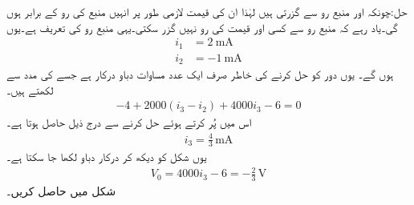 حل:چونکہ  اور  منبع رو سے گزرتی ہیں لہٰذا ان کی قیمت لازمی طور پر انہیں منبع کی رو کے برابر ہوں گی۔یاد رہے کہ منبع رو سے کسی اور قیمت کی رو نہیں گزر سکتی۔یہی منبع رو کی تعریف ہے۔یوں
\begin{align*}
i_1&=\SI{2}{\milli\ampere}\\
i_2&=\SI{-1}{\milli\ampere}
\end{align*}
ہوں گے۔ یوں دور کو حل کرنے کی خاطر صرف ایک عدد مساوات دباو درکار ہے جسے  کی مدد سے لکھتے ہیں۔
\begin{align*}
-4 +2000(i_3-i_2)+4000i_3-6=0
\end{align*} 
اس میں  پُر کرتے ہوئے حل کرنے سے درج ذیل حاصل ہوتا ہے۔
\begin{align*}
i_3=\frac{4}{3}\, \si{\milli\ampere}
\end{align*}
یوں شکل کو دیکھ کر درکار دباو لکھا جا سکتا ہے۔
\begin{align*}
V_0=4000i_3-6=-\frac{2}{3}\, \si{\volt}
\end{align*}
شکل  میں  حاصل کریں۔
